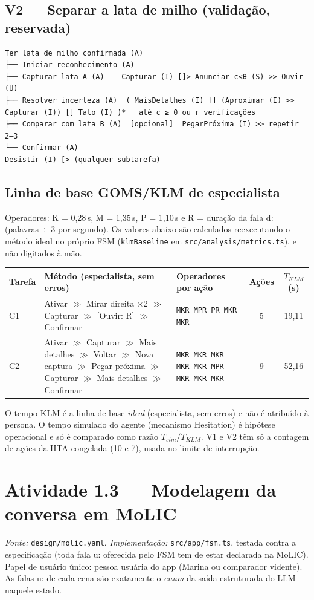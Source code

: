 \documentclass[a4paper,10pt]{article}
\begin{document}
\subsection*{V2 — Separar a lata de milho (validação, reservada)}
\begin{Verbatim}[fontsize=\footnotesize,frame=single]
Ter lata de milho confirmada (A)
├── Iniciar reconhecimento (A)
├── Capturar lata A (A)    Capturar (I) []> Anunciar c<θ (S) >> Ouvir (U)
├── Resolver incerteza (A)  ( MaisDetalhes (I) [] (Aproximar (I) >> Capturar (I)) [] Tato (I) )*   até c ≥ θ ou r verificações
├── Comparar com lata B (A)  [opcional]  PegarPróxima (I) >> repetir 2–3
└── Confirmar (A)
Desistir (I) [> (qualquer subtarefa)
\end{Verbatim}

\subsection*{Linha de base GOMS/KLM de especialista}
Operadores: K = 0,28\,s, M = 1,35\,s, P = 1,10\,s e R = duração da fala d: (palavras $\div$ 3 por segundo). Os valores abaixo são calculados reexecutando o método ideal no próprio FSM (\texttt{klmBaseline} em \texttt{src/analysis/metrics.ts}), e não digitados à mão.

\begin{tabularx}{\linewidth}{l X L{6.5cm} c c}
\toprule
Tarefa & Método (especialista, sem erros) & Operadores por ação & Ações & $T_{KLM}$ (s)\\
\midrule
C1 & Ativar $\gg$ Mirar direita $\times$2 $\gg$ Capturar $\gg$ [Ouvir: R] $\gg$ Confirmar & \texttt{MKR MPR PR MKR MKR} & 5 & 19{,}11\\
\midrule
C2 & Ativar $\gg$ Capturar $\gg$ Mais detalhes $\gg$ Voltar $\gg$ Nova captura $\gg$ Pegar próxima $\gg$ Capturar $\gg$ Mais detalhes $\gg$ Confirmar & \texttt{MKR MKR MKR MKR MKR MPR MKR MKR MKR} & 9 & 52{,}16\\
\bottomrule
\end{tabularx}

\smallskip\noindent O tempo KLM é a linha de base \emph{ideal} (especialista, sem erros) e não é atribuído à persona. O tempo simulado do agente (mecanismo Hesitation) é hipótese operacional e só é comparado como razão $T_{sim}/T_{KLM}$. V1 e V2 têm só a contagem de ações da HTA congelada (10 e 7), usada no limite de interrupção.

\clearpage
\section{Atividade 1.3 --- Modelagem da conversa em MoLIC}
\emph{Fonte:} \texttt{design/molic.yaml}. \emph{Implementação:} \texttt{src/app/fsm.ts}, testada contra a especificação (toda fala u: oferecida pelo FSM tem de estar declarada na MoLIC). Papel de usuário único: pessoa usuária do app (Marina ou comparador vidente). As falas u: de cada cena são exatamente o \emph{enum} da saída estruturada do LLM naquele estado.
\end{document}
